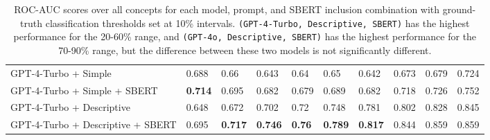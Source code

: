 \begin{table*}[htbp!]
{\begin{tabular}{@{}llllllllll@{}}
GPT-4-Turbo + Simple              & 0.688          & 0.66           & 0.643          & 0.64          & 0.65           & 0.642          & 0.673          & 0.679          & 0.724          \\
GPT-4-Turbo + Simple + SBERT      & \textbf{0.714} & 0.695          & 0.682          & 0.679         & 0.689          & 0.682          & 0.718          & 0.726          & 0.752          \\
GPT-4-Turbo + Descriptive         & 0.648          & 0.672          & 0.702          & 0.72          & 0.748          & 0.781          & 0.802          & 0.828          & 0.845          \\
GPT-4-Turbo + Descriptive + SBERT & 0.695          & \textbf{0.717} & \textbf{0.746} & \textbf{0.76} & \textbf{0.789} & \textbf{0.817} & 0.844          & 0.859          & 0.859          \\ \bottomrule
\end{tabular}%
}
\caption{ROC-AUC scores over all concepts for each model, prompt, and SBERT inclusion combination with ground-truth classification thresholds set at 10\% intervals. \texttt{(GPT-4-Turbo, Descriptive, SBERT)} has the highest performance for the 20-60\% range, and \texttt{(GPT-4o, Descriptive, SBERT)} has the highest performance for the 70-90\% range, but the difference between these two models is not significantly different.}
\label{tab:auc_threshold}
\end{table*}